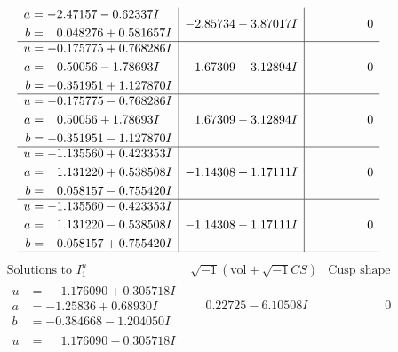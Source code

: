 \documentclass[1p]{elsarticle_modified}
\theoremstyle{definition}
\newcommand{\I}{\sqrt{-1}}
\begin{document}
$$\begin{array}{c|c|c}
\begin{aligned}
a &= -2.47157 - 0.62337 I \\
b &= \phantom{-}0.048276 + 0.581657 I\end{aligned}
 & -2.85734 - 3.87017 I & \phantom{-0.000000 } 0 \\ \hline\begin{aligned}
u &= -0.175775 + 0.768286 I \\
a &= \phantom{-}0.50056 - 1.78693 I \\
b &= -0.351951 + 1.127870 I\end{aligned}
 & \phantom{-}1.67309 + 3.12894 I & \phantom{-0.000000 } 0 \\ \hline\begin{aligned}
u &= -0.175775 - 0.768286 I \\
a &= \phantom{-}0.50056 + 1.78693 I \\
b &= -0.351951 - 1.127870 I\end{aligned}
 & \phantom{-}1.67309 - 3.12894 I & \phantom{-0.000000 } 0 \\ \hline\begin{aligned}
u &= -1.135560 + 0.423353 I \\
a &= \phantom{-}1.131220 + 0.538508 I \\
b &= \phantom{-}0.058157 - 0.755420 I\end{aligned}
 & -1.14308 + 1.17111 I & \phantom{-0.000000 } 0 \\ \hline\begin{aligned}
u &= -1.135560 - 0.423353 I \\
a &= \phantom{-}1.131220 - 0.538508 I \\
b &= \phantom{-}0.058157 + 0.755420 I\end{aligned}
 & -1.14308 - 1.17111 I & \phantom{-0.000000 } 0\\
 \hline 
 \end{array}$$\newpage$$\begin{array}{c|c|c}  
\text{Solutions to }I^u_{1}& \I (\text{vol} + \sqrt{-1}CS) & \text{Cusp shape}\\
 \hline 
\begin{aligned}
u &= \phantom{-}1.176090 + 0.305718 I \\
a &= -1.25836 + 0.68930 I \\
b &= -0.384668 - 1.204050 I\end{aligned}
 & \phantom{-}0.22725 - 6.10508 I & \phantom{-0.000000 } 0 \\ \hline\begin{aligned}
u &= \phantom{-}1.176090 - 0.305718 I \\

\end{aligned}
\end{array}$$
\end{document}
